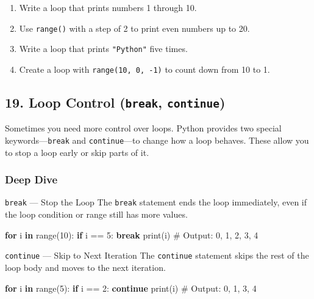 \documentclass[
  letterpaper,
  DIV=11,
  numbers=noendperiod]{scrreprt}
\newenvironment{Shaded}{\begin{snugshade}}{\end{snugshade}}
\newcommand{\BuiltInTok}[1]{\textcolor[rgb]{0.00,0.23,0.31}{#1}}
\newcommand{\CommentTok}[1]{\textcolor[rgb]{0.37,0.37,0.37}{#1}}
\newcommand{\ControlFlowTok}[1]{\textcolor[rgb]{0.00,0.23,0.31}{\textbf{#1}}}
\newcommand{\DecValTok}[1]{\textcolor[rgb]{0.68,0.00,0.00}{#1}}
\newcommand{\KeywordTok}[1]{\textcolor[rgb]{0.00,0.23,0.31}{\textbf{#1}}}
\newcommand{\NormalTok}[1]{\textcolor[rgb]{0.00,0.23,0.31}{#1}}
\newcommand{\OperatorTok}[1]{\textcolor[rgb]{0.37,0.37,0.37}{#1}}
\providecommand{\tightlist}{%
  \setlength{\itemsep}{0pt}\setlength{\parskip}{0pt}}
\begin{document}
\begin{enumerate}
\def\labelenumi{\arabic{enumi}.}
\tightlist
\item
  Write a loop that prints numbers 1 through 10.
\item
  Use \texttt{range()} with a step of 2 to print even numbers up to 20.
\item
  Write a loop that prints \texttt{"Python"} five times.
\item
  Create a loop with \texttt{range(10,\ 0,\ -1)} to count down from 10
  to 1.
\end{enumerate}

\subsection{\texorpdfstring{19. Loop Control (\texttt{break},
\texttt{continue})}{19. Loop Control (break, continue)}}\label{loop-control-break-continue}

Sometimes you need more control over loops. Python provides two special
keywords---\texttt{break} and \texttt{continue}---to change how a loop
behaves. These allow you to stop a loop early or skip parts of it.

\subsubsection{Deep Dive}\label{deep-dive-19}

\texttt{break} --- Stop the Loop The \texttt{break} statement ends the
loop immediately, even if the loop condition or range still has more
values.

\begin{Shaded}
\begin{Highlighting}[]
\ControlFlowTok{for}\NormalTok{ i }\KeywordTok{in} \BuiltInTok{range}\NormalTok{(}\DecValTok{10}\NormalTok{):}
    \ControlFlowTok{if}\NormalTok{ i }\OperatorTok{==} \DecValTok{5}\NormalTok{:}
        \ControlFlowTok{break}
    \BuiltInTok{print}\NormalTok{(i)}
\CommentTok{\# Output: 0, 1, 2, 3, 4}
\end{Highlighting}
\end{Shaded}

\texttt{continue} --- Skip to Next Iteration The \texttt{continue}
statement skips the rest of the loop body and moves to the next
iteration.

\begin{Shaded}
\begin{Highlighting}[]
\ControlFlowTok{for}\NormalTok{ i }\KeywordTok{in} \BuiltInTok{range}\NormalTok{(}\DecValTok{5}\NormalTok{):}
    \ControlFlowTok{if}\NormalTok{ i }\OperatorTok{==} \DecValTok{2}\NormalTok{:}
        \ControlFlowTok{continue}
    \BuiltInTok{print}\NormalTok{(i)}
\CommentTok{\# Output: 0, 1, 3, 4}
\end{Highlighting}
\end{Shaded}
\end{document}
